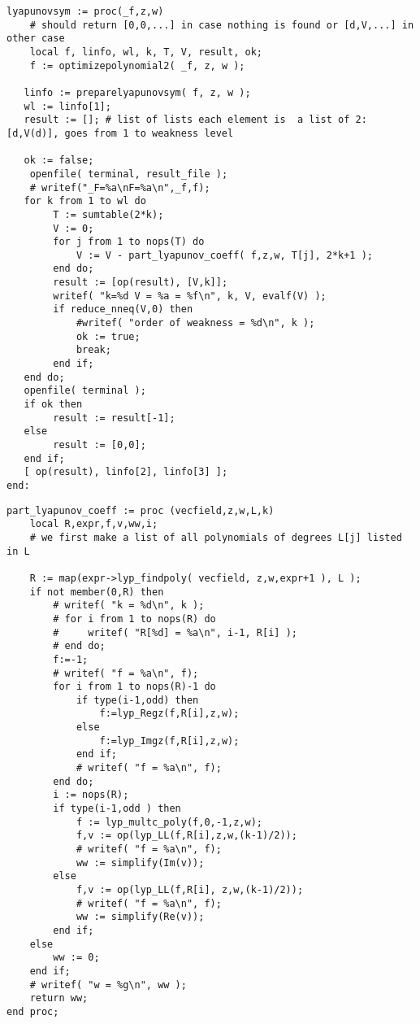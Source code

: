 \documentclass[a4paper,10pt]{article}
\begin{document}
\begin{lstlisting}[name=weakfocus]
lyapunovsym := proc(_f,z,w)
    # should return [0,0,...] in case nothing is found or [d,V,...] in other case
    local f, linfo, wl, k, T, V, result, ok;
    f := optimizepolynomial2( _f, z, w );

   linfo := preparelyapunovsym( f, z, w );
   wl := linfo[1];
   result := []; # list of lists each element is  a list of 2: [d,V(d)], goes from 1 to weakness level

   ok := false;
    openfile( terminal, result_file );
    # writef("_F=%a\nF=%a\n",_f,f);
   for k from 1 to wl do
        T := sumtable(2*k);
        V := 0;
        for j from 1 to nops(T) do
            V := V - part_lyapunov_coeff( f,z,w, T[j], 2*k+1 );
        end do;
        result := [op(result), [V,k]];
        writef( "k=%d V = %a = %f\n", k, V, evalf(V) );
        if reduce_nneq(V,0) then
            #writef( "order of weakness = %d\n", k );
            ok := true;
            break;
        end if;
   end do;
   openfile( terminal );
   if ok then
        result := result[-1];
   else
        result := [0,0];
   end if;
   [ op(result), linfo[2], linfo[3] ];
end:
\end{lstlisting}

\begin{lstlisting}[name=weakfocus]
part_lyapunov_coeff := proc (vecfield,z,w,L,k)
    local R,expr,f,v,ww,i;
    # we first make a list of all polynomials of degrees L[j] listed in L

    R := map(expr->lyp_findpoly( vecfield, z,w,expr+1 ), L );
    if not member(0,R) then
        # writef( "k = %d\n", k );
        # for i from 1 to nops(R) do
        #     writef( "R[%d] = %a\n", i-1, R[i] );
        # end do;
        f:=-1;
        # writef( "f = %a\n", f);
        for i from 1 to nops(R)-1 do
            if type(i-1,odd) then
                f:=lyp_Regz(f,R[i],z,w);
            else
                f:=lyp_Imgz(f,R[i],z,w);
            end if;
            # writef( "f = %a\n", f);
        end do;
        i := nops(R);
        if type(i-1,odd ) then
            f := lyp_multc_poly(f,0,-1,z,w);
            f,v := op(lyp_LL(f,R[i],z,w,(k-1)/2));
            # writef( "f = %a\n", f);
            ww := simplify(Im(v));
        else
            f,v := op(lyp_LL(f,R[i], z,w,(k-1)/2));
            # writef( "f = %a\n", f);
            ww := simplify(Re(v));
        end if;
    else
        ww := 0;
    end if;
    # writef( "w = %g\n", ww );
    return ww;
end proc;
\end{lstlisting}
\end{document}

